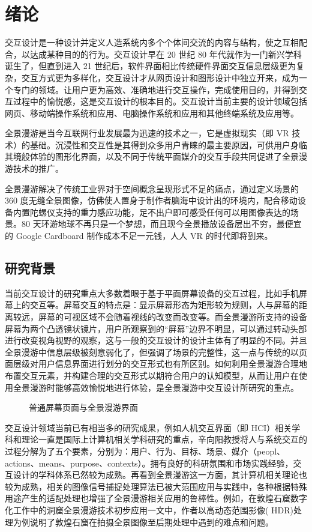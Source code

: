 \chapter{绪论}

交互设计是一种设计并定义人造系统内多个个体间交流的内容与结构，使之互相配合，以达成某种目的的行为。交互设计早在 20 世纪 80 年代就作为一门新兴学科诞生了，但直到进入 21 世纪后，软件界面相比传统硬件界面交互信息层级更为复杂，交互方式更为多样化，交互设计才从网页设计和图形设计中独立开来，成为一个专门的领域。让用户更为高效、准确地进行交互操作，完成使用目的，并得到交互过程中的愉悦感，这是交互设计的根本目的。交互设计当前主要的设计领域包括网页、移动端操作系统和应用、电脑操作系统和应用和其他终端系统及应用等。

全景漫游是当今互联网行业发展最为迅速的技术之一，它是虚拟现实（即 VR 技术）的基础。沉浸性和交互性是其得到众多用户青睐的最主要原因，可供用户身临其境般体验的图形化界面，以及不同于传统平面媒介的交互手段共同促进了全景漫游技术的推广。

全景漫游解决了传统工业界对于空间概念呈现形式不足的痛点，通过定义场景的 360 度无缝全景图像，仿佛使人置身于制作者脑海中设计出的环境内，配合移动设备内置陀螺仪支持的重力感应功能，足不出户即可感受任何可以用图像表达的场景。80 天环游地球不再只是一个梦想，而且现今全景播放设备层出不穷，最便宜的 Google Cardboard 制作成本不足一元钱，人人 VR 的时代即将到来。

\section{研究背景}
当前交互设计的研究重点大多数着眼于基于平面屏幕设备的交互过程，比如手机屏幕上的交互等。屏幕交互的特点是：显示屏幕形态为矩形较为规则，人与屏幕的距离较远，屏幕的可视区域不会随着视线的改变而改变等。而全景漫游所支持的设备屏幕为两个凸透镜状镜片，用户所观察到的“屏幕”边界不明显，可以通过转动头部进行改变视角视野的观察，这与一般的交互设计的设计主体有了明显的不同。并且全景漫游中信息层级被刻意弱化了，但强调了场景的完整性，这一点与传统的以页面层级对用户信息界面进行划分的交互形式也有所区别。如何利用全景漫游合理地布置交互元素，并构建合理的交互形式以期符合用户的认知模型，从而让用户在使用全景漫游时能够高效愉悦地进行体验，是全景漫游中交互设计所研究的重点。

\begin{figure}[htp]
\centering
{}
\caption{普通屏幕页面与全景漫游界面}
\label{fig:screen}
\end{figure}

交互设计领域当前已有相当多的研究成果，例如人机交互界面（即 HCI）相关学科和理论一直是国际上计算机相关学科研究的重点，辛向阳教授将人与系统交互的过程分解为了五个要素，分别为：用户、行为、目标、场景、媒介（peopl、actions、means、purpose、contexts）。拥有良好的科研氛围和市场实践经验，交互设计的学科体系已然较为成熟。再看到全景漫游这一方面，其计算机相关理论也较为成熟，相关的图像信号捕捉处理算法已被大范围应用与实践中，各种根据特殊用途产生的适配处理也增强了全景漫游相关应用的鲁棒性。例如，在敦煌石窟数字化工作中的洞窟全景漫游技术初步应用一文中，作者以高动态范围影像( HDR)处理为例说明了敦煌石窟在拍摄全景图像至后期处理中遇到的难点和问题。

